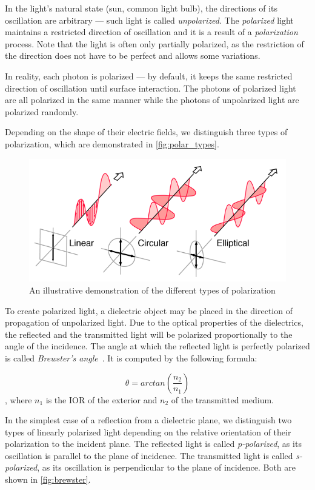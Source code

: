 In the light's natural state (sun, common light bulb), the directions of its oscillation are arbitrary --- such light is called \emph{unpolarized}. The \emph{polarized} light maintains a restricted direction of oscillation and it is a result of a \emph{polarization} process. Note that the light is often only partially polarized, as the restriction of the direction does not have to be perfect and allows some variations.

In reality, each photon is polarized --- by default, it keeps the same restricted direction of oscillation until surface interaction. The photons of polarized light are all polarized in the same manner while the photons of unpolarized light are polarized randomly. 

Depending on the shape of their electric fields, we distinguish three types of polarization, which are demonstrated in \autoref{fig:polar_types}.

\begin{figure}[h]
	\centering
	\includegraphics[width=.7\linewidth]{img/polar_types.png}
	\caption[polar types]{An illustrative demonstration of the different types of polarization \footnotemark}
	\label{fig:polar_types}
\end{figure}

To create polarized light, a dielectric object may be placed in the direction of propagation of unpolarized light. Due to the optical properties of the dielectrics, the reflected and the transmitted light will be polarized proportionally to the angle of the incidence. The angle at which the reflected light is perfectly polarized is called \emph{Brewster's angle}~\cite{brewster1815laws}. It is computed by the following formula:

\begin{equation}
\theta=arctan(\frac{n_2}{n_1})
\end{equation}
, where $n_1$ is the IOR of the exterior and $n_2$ of the transmitted medium.

In the simplest case of a reflection from a dielectric plane, we distinguish two types of linearly polarized light depending on the relative orientation of their polarization to the incident plane. The reflected light is called \emph{p-polarized}, as its oscillation is parallel to the plane of incidence. The transmitted light is called \emph{s-polarized}, as its oscillation is perpendicular to the plane of incidence. Both are shown in \autoref{fig:brewster}.

